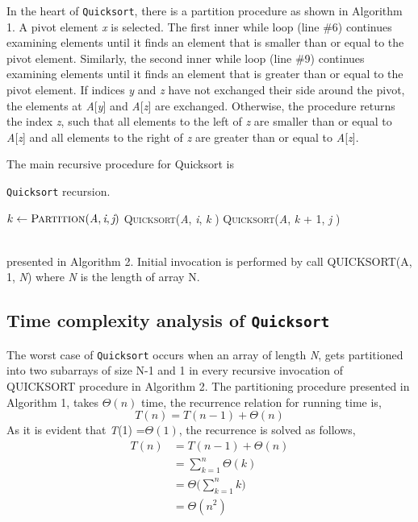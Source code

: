 \documentclass[a4paper, 10pt,twocolumn]{article}
\begin{document}
In the heart of \texttt{Quicksort}, there is a partition procedure as shown in Algorithm 1. A pivot element \textit{x} is selected. The first inner while loop (line \#6) continues examining elements until it finds an element that is smaller than or equal to the pivot element. Similarly, the second inner while loop (line \#9) continues examining elements until it finds an element that is greater than or equal to the pivot element. If indices \textit{y} and \textit{z} have not exchanged their side around the pivot, the elements at \textit{A}[\textit{y}] and \textit{A}[\textit{z}] are exchanged. Otherwise, the procedure returns the index \textit{z}, such that all elements to the left of \textit{z} are smaller than or equal to \textit{A}[\textit{z}] and all elements to the right of \textit{z} are greater than or equal to \textit{A}[\textit{z}].

The main recursive procedure for Quicksort is
\begin{algorithm}
  \caption{\texttt{Quicksort} recursion.}
  \label{algo:quick_rec}
  \begin{algorithmic}[1]
     \newline
            \State $k \leftarrow \textsc{Partition}(\textit{A}, \textit{i}, \textit{j} ) $ 
            \State \textsc{Quicksort}(\textit{A}, \textit{i}, \textit{k} ) 
            \State \textsc{Quicksort}(\textit{A}, \textit{k} + 1, \textit{j} ) 
         \EndIf
     \EndProcedure 
  \end{algorithmic}
\end{algorithm} \\
presented in Algorithm 2. Initial invocation is performed by call QUICKSORT(A, 1, \textit{N}) where \textit{N} is the length of array N.
\subsection{Time complexity analysis of \texttt{Quicksort}}
The worst case of \texttt{Quicksort} occurs when an array of length \textit{N}, gets partitioned into two subarrays of size N-1 and 1 in every recursive invocation of QUICKSORT procedure in Algorithm 2. The partitioning procedure presented in Algorithm 1, takes $\Theta(n)$ time, the recurrence relation for running time
is,
\[\textit{T}(n) = \textit{T}(n-1) + \Theta(n) \]
As it is evident that \textit{T}(1) =$\Theta(1)$, the recurrence is solved as follows,
\begin{align*} 
T(n) &= T(n-1) + \Theta(n) \\
&=\sum_{k=1}^{n} \Theta(k) \\
&=\Theta\Bigg(\sum_{k=1}^{n} k\Bigg) \\
&=\Theta(n^{2})
\end{align*}
\end{document}
